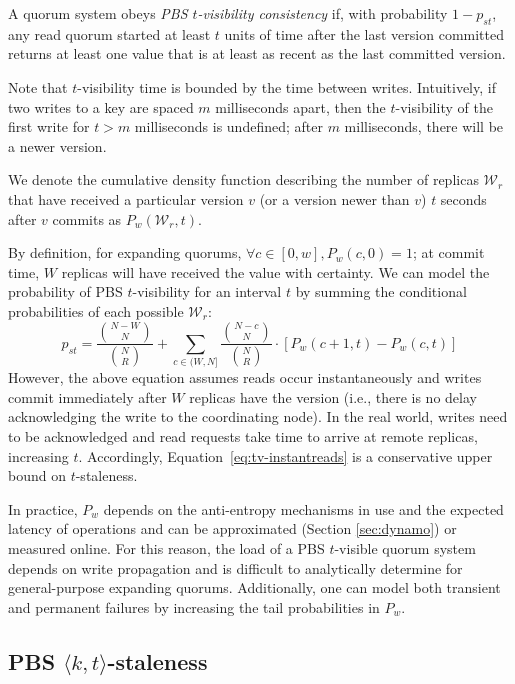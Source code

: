 \documentclass{vldb}
\newcommand{\subsectionskip}{-0em}
\begin{document}
\begin{definition}
A quorum system obeys \textit{PBS $t$-visibility consistency} if, with
probability $1-p_{st}$, any read quorum started at least $t$ units
of time after the last version committed returns at least one value
that is at least as recent as the last committed version.
\end{definition}

Note that $t$-visibility time is bounded by the time between writes.
Intuitively, if two writes to a key are spaced $m$ milliseconds apart,
then the $t$-visibility of the first write for $t > m$ milliseconds is
undefined; after $m$ milliseconds, there will be a newer version.

We denote the cumulative density function describing the number of
replicas $\mathcal{W}_r$ that have received a particular version $v$ (or
a version newer than $v$) $t$ seconds after $v$ commits as
$P_w(\mathcal{W}_r, t)$.

By definition, for expanding quorums, $\forall c \in [0, w], P_w(c,0)
= 1$; at commit time, $W$ replicas will have received the value with
certainty.  We can model the probability of PBS $t$-visibility for an
interval $t$ by summing the conditional probabilities of each possible
$\mathcal{W}_r$:
\begin{equation}
\label{eq:tv-instantreads}
p_{st} = \frac{{N-W \choose N}}{{N \choose R}}+\sum_{c\in(W, N]} \frac{{N-c \choose N}}{{N \choose R}}\cdot [P_w(c+1, t)-P_w(c,t)]
\end{equation}
However, the above equation assumes reads occur instantaneously and
writes commit immediately after $W$ replicas have the version (i.e.,
there is no delay acknowledging the write to the coordinating node).
In the real world, writes need to be acknowledged and read requests
take time to arrive at remote replicas, increasing $t$.  Accordingly,
Equation~\ref{eq:tv-instantreads} is a conservative upper bound on
$t$-staleness.

In practice, $P_w$ depends on the anti-entropy mechanisms in use and the
expected latency of operations and can be approximated (Section
\ref{sec:dynamo}) or measured online.  For this reason, the load of a
PBS $t$-visible quorum system depends on write propagation and is
difficult to analytically determine for general-purpose expanding
quorums.  Additionally, one can model both transient and permanent
failures by increasing the tail probabilities in $P_w$.


\vspace{\subsectionskip}\subsection{PBS $\langle k, t \rangle$-staleness}
\end{document}
